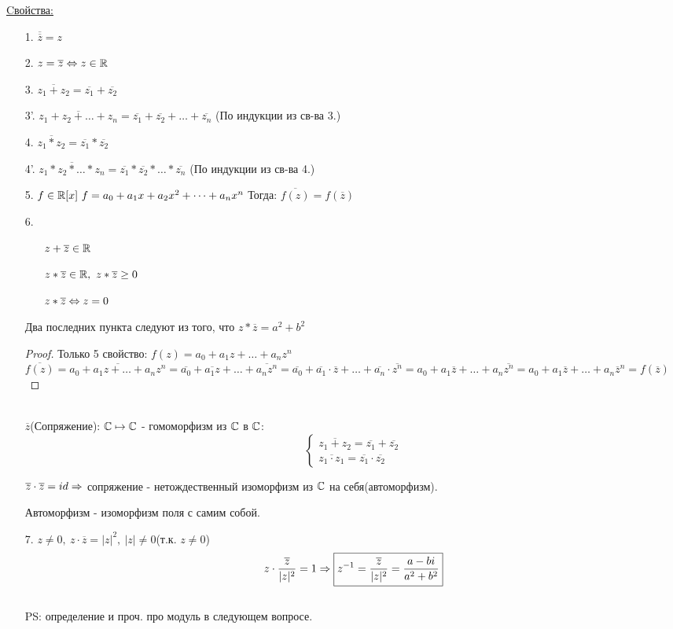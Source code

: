 \underline{Cвойства:}
\begin{itemize}
\item[1.] $\overline{\overline{z}} = z$
\item[2.] $z = \overline{z} \Leftrightarrow z \in \mathbb{R}$
\item[3.] $\overline{z_1 + z_2} = \overline{z_1} + \overline{z_2}$
\item[3'.] $\overline{z_1 + z_2 + \dots + z_n} = \overline{z_1} + \overline{z_2} + \dots + \overline{z_n}$ (По индукции из св-ва 3.)
\item[4.] $\overline{z_1*z_2} = \overline{z_1} * \overline{z_2}$
\item[4'.] $\overline{z_1 * z_2 * \dots * z_n} = \overline{z_1} * \overline{z_2} * \dots * \overline{z_n}$ (По индукции из св-ва 4.)
\item[5.] $f \in \mathbb{R}[x]~f = a_0 + a_1x + a_2x^2 + \dots + a_nx^n$ Тогда: $\overline{f(z)} = f(\overline{z})$
\item[6.] \begin{itemize}
			\item[\bullet] $z + \overline{z} \in \mathbb{R}$ 
			\item[\bullet] $z*\overline{z} \in \mathbb{R},~z*\overline{z} \ge 0$
			\item[\bullet] $z*\overline{z} \Leftrightarrow z = 0$
		 \end{itemize}	
		 Два последних пункта следуют из того, что $z*\overline{z} = a^2 + b^2$
\begin{proof}
Только 5 свойство:
$f(z)=a_0 + a_1z + \dots + a_nz^n$
$\overline{f(z)} = \overline{a_0 + a_1z + \dots + a_nz^n} = \overline{a_0} + \overline{a_1z} + \dots + \overline{a_nz^n} = \overline{a_0} + \overline{a_1} \cdot \overline{z} + \dots + \overline{a_n} \cdot \overline{z^n} = a_0 + a_1\overline{z} + \dots + a_n\overline{z^n} = a_0 + a_1\overline{z} + \dots + a_n{\overline{z}}^n = f(\overline{z})$
\end{proof}   
\\

$\overline{z}$(Сопряжение): $\mathbb{C} \mapsto \mathbb{C}$ - гомоморфизм из $\mathbb{C}$ в $\mathbb{C}$:\\
$$
	\begin{cases}
	\overline{z_1 + z_2} = \overline{z_1} + \overline{z_2} \\
	\overline{z_1 \cdot z_1} = \overline{z_1} \cdot \overline{z_2}
	\end{cases}
$$

$\overline{z} \cdot \overline{z} = id \Rightarrow $ сопряжение - нетождественный изоморфизм из $\mathbb{C}$ на себя(автоморфизм).
\begin{Def}
	Автоморфизм - изоморфизм поля с самим собой.
\end{Def}
\item[7.] $z \ne 0,~z \cdot \overline{z} = |z|^2,~|z| \ne 0$(т.к. $z \ne 0$) \\
$$ z \cdot \frac{\overline{z}}{|z|^2} = 1 \Rightarrow \boxed{z^{-1} = \frac{\overline{z}}{|z|^2} = \frac{a - bi}{a^2 + b^2}} $$ \\
PS: определение и проч. про модуль в следующем вопросе.
\end{itemize}

